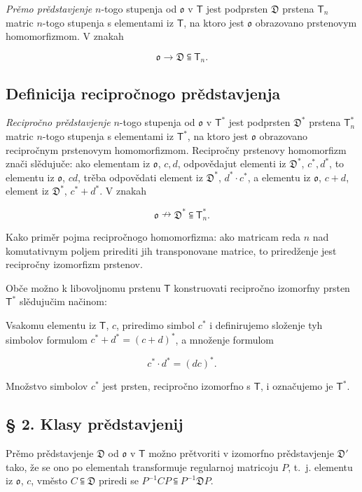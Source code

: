 \documentclass[11pt]{article}
\begin{document}
\emph{Prěmo prědstavjenje} \(n\)-togo stupenja od \(\mathfrak{o}\) v \(\mathsf T\) jest podprsten \(\mathfrak D\) prstena \(\mathsf T_n\) matric \(n\)-togo stupenja s elementami iz \(\mathsf T\), na ktoro jest \(\mathfrak{o}\) obrazovano prstenovym homomorfizmom. V znakah

\[
\mathfrak{o}\to\mathfrak D\subseteqq\mathsf T_n.
\]

\subsection*{Definicija recipročnogo prědstavjenja}\label{definition-der-reziproken-darstellung}

\emph{Recipročno prědstavjenje} \(n\)-togo stupenja od \(\mathfrak{o}\) v \(\mathsf T^*\) jest podprsten \(\mathfrak D^*\) prstena \(\mathsf T_n^*\) matric \(n\)-togo stupenja s elementami iz \(\mathsf T^*\), na ktoro jest \(\mathfrak{o}\) obrazovano recipročnym prstenovym homomorfizmom. Recipročny prstenovy homomorfizm znači slědujuče: ako elementam iz \(\mathfrak{o}\), \(c,d\), odpovědajut elementi iz \(\mathfrak D^*\), \(c^*,d^*\), to elementu iz \(\mathfrak{o}\), \(cd\), trěba odpovědati element iz \(\mathfrak D^*\), \(d^*\cdot c^*\), a elementu iz \(\mathfrak{o}\), \(c+d\), element iz \(\mathfrak D^*\), \(c^*+d^*\). V znakah

\[
\mathfrak{o}\nrightarrow\mathfrak D^*\subseteqq\mathsf T_n^*.
\]

Kako priměr pojma recipročnogo homomorfizma: ako matricam reda \(n\) nad komutativnym poljem prirediti jih transponovane matrice, to priredženje jest recipročny izomorfizm prstenov.

Obče možno k libovoljnomu prstenu \(\mathsf T\) konstruovati recipročno izomorfny prsten \(\mathsf T^*\) slědujučim načinom:

Vsakomu elementu iz \(\mathsf T\), \(c\), priredimo simbol \(c^*\) i definirujemo složenje tyh simbolov formulom \(c^*+d^*=(c+d)^*\), a množenje formulom

\[
c^*\cdot d^*=(dc)^*.
\]

Množstvo simbolov \(c^*\) jest prsten, recipročno izomorfno s \(\mathsf T\), i označujemo je \(\mathsf T^*\).

\subsection*{§ 2. Klasy prědstavjenij}\label{darstellungsklassen}

Prěmo prědstavjenje \(\mathfrak D\) od \(\mathfrak{o}\) v \(\mathsf T\) možno prětvoriti v izomorfno prědstavjenje \(\mathfrak D'\) tako, že se ono po elementah transformuje regularnoj matricoju \(P\), t.~j. elementu iz \(\mathfrak{o}\), \(c\), vměsto \(C\subseteqq\mathfrak D\) priredi se \(P^{-1}CP\subseteqq P^{-1}\mathfrak D P\).
\end{document}
